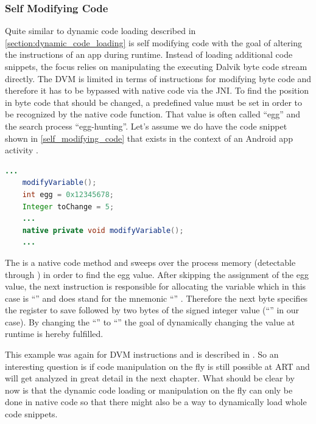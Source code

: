 \subsubsection{Self Modifying Code}
Quite similar to dynamic code loading described in
\autoref{section:dynamic_code_loading} is self modifying code with the goal
of altering the instructions of an app during runtime.
Instead of loading additional code snippets, the focus relies on
manipulating the executing Dalvik byte code stream directly.
The DVM is limited in terms of instructions for modifying byte code
and therefore it has to be bypassed with native code via the JNI.
To find the position in byte code that should be changed, a predefined
value must be set in order to be recognized by the native code function.
That value is often called ``egg'' and the search process ``egg-hunting''.
Let's assume we do have the code snippet shown in \autoref{self_modifying_code} that exists in the context of an Android app activity
\parencite{code_protection}.
 \begin{lstlisting}[language=Java, caption=Self Modifying Code Example, label=self_modifying_code]
    ...
    modifyVariable();
    int egg = 0x12345678;
    Integer toChange = 5;
    ...
    native private void modifyVariable();
    ...
\end{lstlisting}

The  is a native code method and sweeps
over the process memory (detectable through )
in order to find the egg value. After skipping the assignment of
the egg value, the next instruction is responsible for allocating
the  variable which in this case is ``''
and does stand for the mnemonic ``''
\parencite{bytecode_format}. Therefore the next byte specifies the
register to save followed by two bytes of the signed integer value
(``'' in our case). By changing the ``'' to
``'' the goal of dynamically changing the value at runtime
is hereby fulfilled.

This example was again for DVM instructions and is described in \parencite{code_protection}. So an interesting question is if code manipulation on the fly
is still possible at ART and will get analyzed in great detail in the next chapter.
What should be clear by now is that the dynamic code loading or manipulation on the
fly can only be done in native code so that there might also be a way to dynamically
load whole code snippets.
